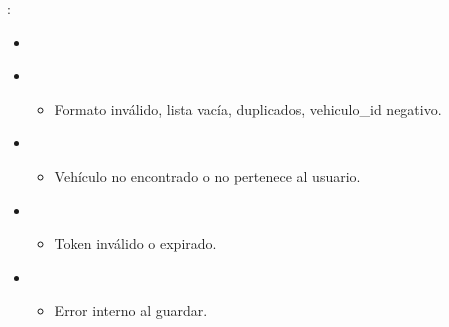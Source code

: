 \documentclass[letterpaper,10pt,spanish]{sphinxmanual}
\begin{document}
\begin{fulllineitems}
\sphinxAtStartPar
{}:
\begin{itemize}
\item {} 
\sphinxAtStartPar
{}

\begin{sphinxVerbatim}[commandchars=\\\{\}]
\end{sphinxVerbatim}

\item {} 
\sphinxAtStartPar
{}
\begin{itemize}
\item {} 
\sphinxAtStartPar
Formato inválido, lista vacía, duplicados, vehiculo\_id negativo.

\end{itemize}

\begin{sphinxVerbatim}[commandchars=\\\{\}]
\end{sphinxVerbatim}

\item {} 
\sphinxAtStartPar
{}
\begin{itemize}
\item {} 
\sphinxAtStartPar
Vehículo no encontrado o no pertenece al usuario.

\end{itemize}

\begin{sphinxVerbatim}[commandchars=\\\{\}]
\end{sphinxVerbatim}

\item {} 
\sphinxAtStartPar
{}
\begin{itemize}
\item {} 
\sphinxAtStartPar
Token inválido o expirado.

\end{itemize}

\item {} 
\sphinxAtStartPar
{}
\begin{itemize}
\item {} 
\sphinxAtStartPar
Error interno al guardar.

\end{itemize}

\end{itemize}

\end{fulllineitems}
\end{document}

